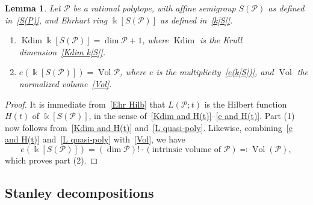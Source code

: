 \documentclass[noamsfonts,10pt]{amsart}
\renewcommand{\P}{\mathcal{P}}
\renewcommand{\k}{\Bbbk}
\DeclareMathOperator{\Vol}{Vol}
\DeclareMathOperator{\Kdim}{Kdim}
\newcommand{\1}{\mathbf{1}}
\theoremstyle{plain}
\newtheorem{lemma}[theorem]{Lemma}
\theoremstyle{definition}
\numberwithin{equation}{section}
\begin{document}
\begin{lemma}
    \label{lemma:Kdim and e are dim and vol}
    Let $\P$ be a rational polytope, with affine semigroup $S(\P)$ as defined in~\eqref{S(P)}, and Ehrhart ring $\k[S(\P)]$ as defined in~\eqref{k[S]}.
    \begin{enumerate}[label=\textup{(\arabic*)}]
        \item \label{Kdim = dim P + 1} $\Kdim \k[S(\P)] = \dim \P + 1$, where $\Kdim$ is the Krull dimension~\eqref{Kdim k[S]}.

        \item \label{e = Vol} $e(\k[S(\P)]) = \Vol \P$, where $e$ is the multiplicity~\eqref{e(k[S])}, and $\Vol$ the normalized volume~\eqref{Vol}.
    \end{enumerate}
\end{lemma}

\begin{proof}
    It is immediate from~\eqref{Ehr Hilb} that $L(\P; t)$ is the Hilbert function $H(t)$ of $\k[S(\P)]$, in the sense of~\eqref{Kdim and H(t)}--\eqref{e and H(t)}.
    Part (1) now follows from~\eqref{Kdim and H(t)} and~\eqref{L quasi-poly}.
    Likewise, combining~\eqref{e and H(t)} and~\eqref{L quasi-poly} with~\eqref{Vol}, we have
    \[
        e( \k[S(\P)]) = (\dim \P)! \cdot (\text{intrinsic volume of $\P$}) \eqcolon \Vol(\P),
    \]
    which proves part (2).
\end{proof}

\subsection*{Stanley decompositions}
\end{document}

